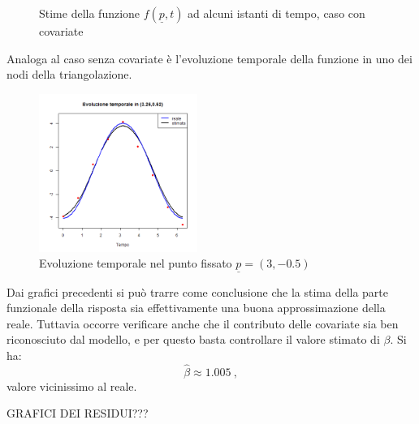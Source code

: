 \documentclass[a4paper,11pt,twoside,openright]{book}							%
\begin{document}
\begin{figure}[h]
{   }
\caption{Stime della funzione $f(\underline p,t)$ ad alcuni istanti di tempo, caso con covariate}
\label{fig:DomCcovar_ris}
\end{figure}

Analoga al caso senza covariate è l'evoluzione temporale della funzione in uno dei nodi della triangolazione.

\begin{figure}[h]
\centering
\includegraphics[width=0.46\textwidth]{Immagini/DomCcovar_tfissato.png}   
\caption{Evoluzione temporale nel punto fissato $\underline p=(3,-0.5)$}
\label{fig:DomCcovar_ris2}
\end{figure}

Dai grafici precedenti si può trarre come conclusione che la stima della parte funzionale della risposta sia effettivamente una buona approssimazione della reale. Tuttavia occorre verificare anche che il contributo delle covariate sia ben riconosciuto dal modello, e per questo basta controllare il valore stimato di $\beta$. Si ha:
$$
\hat{\beta} \approx 1.005 \ ,
$$
valore vicinissimo al reale.


GRAFICI DEI RESIDUI???
\end{document}
